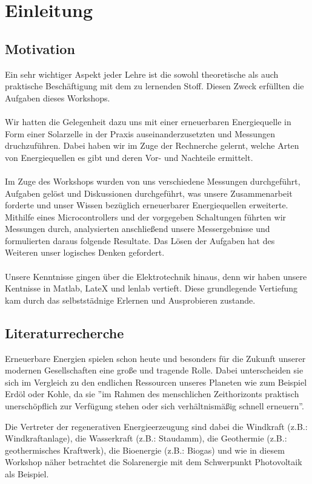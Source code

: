 \clearpage
\section{Einleitung}

\subsection{Motivation}
Ein sehr wichtiger Aspekt jeder Lehre ist die sowohl theoretische als auch praktische Beschäftigung mit dem zu lernenden Stoff. Diesen Zweck erfüllten die Aufgaben dieses Workshops.
\\
\\
Wir hatten die Gelegenheit dazu uns mit einer erneuerbaren Energiequelle in Form einer Solarzelle in der Praxis auseinanderzusetzten und Messungen druchzuführen. Dabei haben wir im Zuge der Rechnerche gelernt, welche Arten von Energiequellen es gibt und deren Vor- und Nachteile ermittelt. 
\\
\\
Im Zuge des Workshops wurden von uns verschiedene Messungen durchgeführt, Aufgaben gelöst und Diskussionen durchgeführt, was unsere Zusammenarbeit forderte und unser Wissen bezüglich erneuerbarer Energiequellen erweiterte. Mithilfe eines Microcontrollers und der vorgegeben Schaltungen führten wir Messungen durch, analysierten anschließend unsere Messergebnisse und formulierten daraus folgende Resultate. Das Lösen der Aufgaben hat des Weiteren unser logisches Denken gefordert.
\\
\\
Unsere Kenntnisse gingen über die Elektrotechnik hinaus, denn wir haben unsere Kentnisse in Matlab, LateX und lenlab vertieft. Diese grundlegende Vertiefung kam durch das selbststädnige Erlernen und Ausprobieren zustande.

\subsection{Literaturrecherche}
Erneuerbare Energien spielen schon heute und besonders für die Zukunft unserer modernen Gesellschaften eine große und tragende Rolle. Dabei unterscheiden sie sich im Vergleich zu den endlichen Ressourcen unseres Planeten wie zum Beispiel Erdöl oder Kohle, da sie ''im Rahmen des menschlichen Zeithorizonts praktisch unerschöpflich zur Verfügung stehen oder sich verhältnismäßig schnell erneuern''. \cite{wikipedia_erneuerbare}

Die Vertreter der regenerativen Energieerzeugung sind dabei die Windkraft (z.B.: Windkraftanlage), die Wasserkraft (z.B.: Staudamm), die Geothermie (z.B.: geothermisches Kraftwerk), die Bioenergie (z.B.: Biogas) und wie in diesem Workshop näher betrachtet die Solarenergie mit dem Schwerpunkt Photovoltaik als Beispiel.

